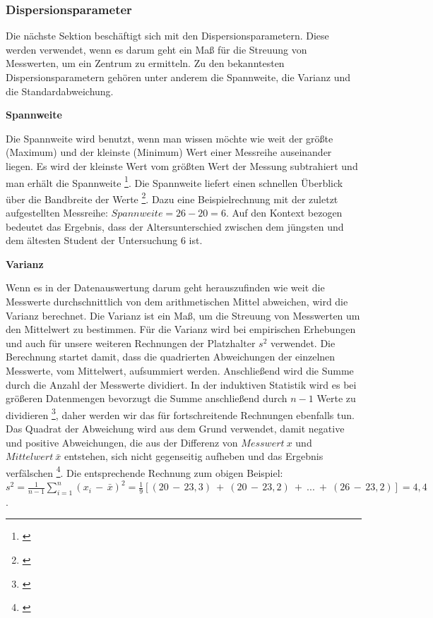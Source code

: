 \subsubsection{Dispersionsparameter}
Die nächste Sektion beschäftigt sich mit den Dispersionsparametern. Diese werden verwendet, wenn es darum geht ein Maß für die Streuung von Messwerten, um ein Zentrum zu ermitteln. Zu den bekanntesten Dispersionsparametern gehören unter anderem die Spannweite, die Varianz und die Standardabweichung.

\textbf{Spannweite}

Die Spannweite wird benutzt, wenn man wissen möchte wie weit der größte (Maximum) und der kleinste (Minimum) Wert einer Messreihe auseinander liegen. Es wird der kleinste Wert vom größten Wert der Messung subtrahiert und man erhält die Spannweite \footnote{\cite[vgl.][62]{Fahrmeir2016}}. Die Spannweite liefert einen schnellen Überblick über die Bandbreite der Werte \footnote{\cite[vgl.][38]{Kronthaler2016}}. Dazu eine Beispielrechnung mit der zuletzt aufgestellten Messreihe: $Spannweite = 26 - 20 = 6$. Auf den Kontext bezogen bedeutet das Ergebnis, dass der Altersunterschied zwischen dem jüngsten und dem ältesten Student der Untersuchung 6 ist.

\textbf{Varianz}

Wenn es in der Datenauswertung darum geht herauszufinden wie weit die Messwerte durchschnittlich von dem arithmetischen Mittel abweichen, wird die Varianz berechnet. Die Varianz ist ein Maß, um die Streuung von Messwerten um den Mittelwert zu bestimmen. Für die Varianz wird bei empirischen Erhebungen und auch für unsere weiteren Rechnungen der Platzhalter $s^2$ verwendet. Die Berechnung startet damit, dass die quadrierten Abweichungen der einzelnen Messwerte, vom Mittelwert, aufsummiert werden. Anschließend wird die Summe durch die Anzahl der Messwerte dividiert. In der induktiven Statistik wird es bei größeren Datenmengen bevorzugt die Summe anschließend durch $n-1$ Werte zu dividieren \footnote{\cite[vgl.][65]{Fahrmeir2016}}, daher werden wir das für fortschreitende Rechnungen ebenfalls tun. Das Quadrat der Abweichung wird aus dem Grund verwendet, damit negative und positive Abweichungen, die aus der Differenz von $Messwert\:x$ und $Mittelwert\:\bar{x} $ entstehen, sich nicht gegenseitig aufheben und das Ergebnis verfälschen \footnote{\cite[vgl.][65]{Fahrmeir2016}}. Die entsprechende Rechnung zum obigen Beispiel: \\
$s^2 = \frac{1}{n - 1} \sum \limits_{i=1}^n (x_i\,-\,\bar{x})^2 = \frac{1}{9}[ (20\,-\,23,3)\:+\:(20\,-\,23,2)\:+\:...\:+\:(26\,-\,23,2)]= 4,4$. 

